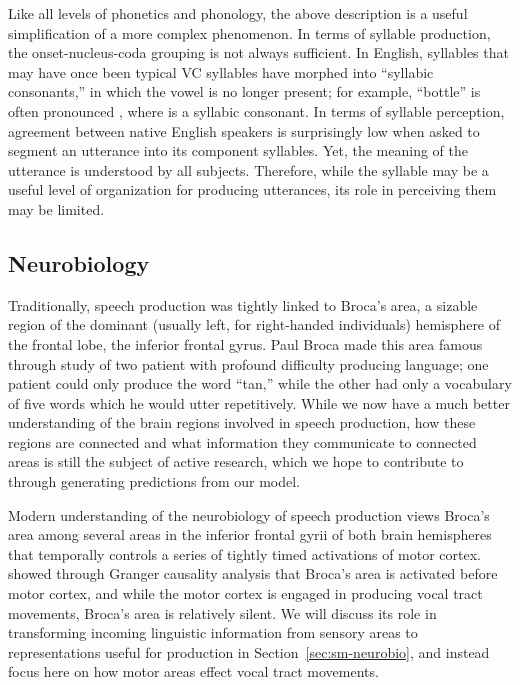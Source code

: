 Like all levels of phonetics and phonology,
the above description is a useful simplification
of a more complex phenomenon.
In terms of syllable production,
the onset-nucleus-coda grouping
is not always sufficient.
In English, syllables that may have once
been typical VC syllables have morphed
into ``syllabic consonants,'' in which
the vowel is no longer present;
for example, ``bottle'' is often
pronounced \ipa{[b6tl]},
where \ipa{[l]} is a syllabic consonant.
In terms of syllable perception,
agreement between native English speakers
is surprisingly low when
asked to segment an utterance
into its component syllables.
Yet, the meaning of the utterance
is understood by all subjects.
Therefore, while the syllable
may be a useful level of organization
for producing utterances,
its role in perceiving them
may be limited.


\subsection{Neurobiology}
\label{sec:prod-neurobio}

Traditionally, speech production
was tightly linked to Broca's area,
a sizable region of the dominant
(usually left, for right-handed individuals)
hemisphere of the frontal lobe,
the inferior frontal gyrus.
Paul Broca made this area famous
through study of two patient
with profound difficulty producing language;
one patient could only produce the word ``tan,''
while the other had only a vocabulary
of five words which he would utter repetitively.
While we now have a much better understanding
of the brain regions
involved in speech production,
how these regions are connected
and what information they communicate
to connected areas is still
the subject of active research,
which we hope to contribute to
through generating predictions
from our model.

Modern understanding of
the neurobiology of speech production
views Broca's area among several
areas in the inferior frontal gyrii
of both brain hemispheres
that temporally controls a series
of tightly timed activations
of motor cortex.
\citep{flinker2015}
showed through Granger causality analysis
that Broca's area is activated
before motor cortex,
and while the motor cortex is
engaged in producing vocal tract movements,
Broca's area is relatively silent.
We will discuss its role in
transforming incoming linguistic
information from sensory areas
to representations useful for production
in Section~\ref{sec:sm-neurobio},
and instead focus here on
how motor areas effect vocal tract movements.

